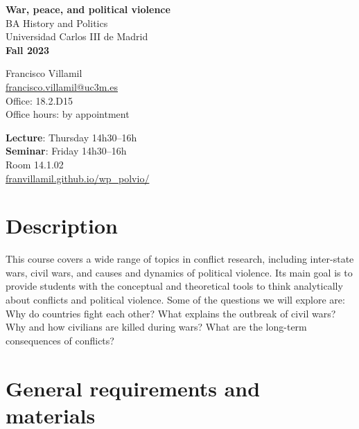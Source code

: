 \documentclass[12pt, a4paper]{article}
\begin{document}
\begin{center}
{\LARGE\bfseries War, peace, and political violence}\\\vspace{10pt}
BA History and Politics\\
Universidad Carlos III de Madrid\\\vspace{10pt}
{\large\bfseries Fall 2023}\\
\end{center}

\vspace{20pt}

\begin{minipage}{0.54\textwidth}
\flushleft
Francisco Villamil\\
\href{francisco.villamil@uc3m.es}{francisco.villamil@uc3m.es}\\
Office: 18.2.D15\\
Office hours: by appointment
\end{minipage}\hfill
\begin{minipage}{0.39\textwidth}
\flushleft
\textbf{Lecture}: Thursday 14h30--16h\\
\textbf{Seminar}: Friday 14h30--16h\\\vspace{5pt}
Room 14.1.02\\
\href{https://franvillamil.github.io/wp_polvio/}{franvillamil.github.io/wp\_polvio/}
\end{minipage}


\vspace{10pt}
\section{Description}

This course covers a wide range of topics in conflict research, including inter-state wars, civil wars, and causes and dynamics of political violence.
Its main goal is to provide students with the conceptual and theoretical tools to think analytically about conflicts and political violence. Some of the questions we will explore are: Why do countries fight each other?
What explains the outbreak of civil wars? Why and how civilians are killed during wars? What are the long-term consequences of conflicts?

\section{General requirements and materials}
\end{document}
